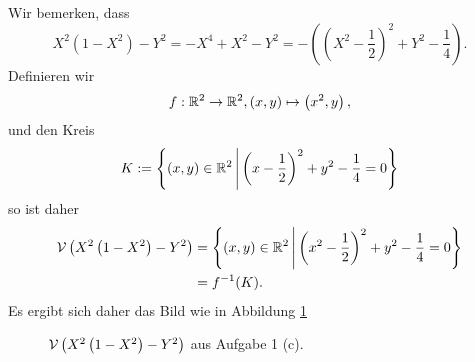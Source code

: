 \documentclass[a4paper,10pt]{article}
\begin{document}
\subsection{}
Wir bemerken, dass
\[
 X^2 \left( 1 - X^2 \right) - Y^2
 = -X^4 + X^2 - Y^2
 = -\left( \left(X^2 - \frac{1}{2} \right)^2 + Y^2 - \frac{1}{4} \right).
\]
Definieren wir
\[
 f : \mathbb{R}^2 \to \mathbb{R}^2, (x,y) \mapsto \left(x^2,y\right),
\]
und den Kreis
\[
 K := \left\{ (x,y) \in \mathbb{R}^2 \,\middle|\, \left(x - \frac{1}{2} \right)^2 + y^2 - \frac{1}{4} = 0 \right\}
\]
so ist daher
\begin{align*}
 \mathcal{V}\left( X^2 \left( 1 - X^2 \right) - Y^2 \right)
 &= \left\{ (x,y) \in \mathbb{R}^2 \,\middle|\, \left(x^2 - \frac{1}{2} \right)^2 + y^2 - \frac{1}{4} = 0 \right\} \\
 &= f^{-1}(K).
\end{align*}
Es ergibt sich daher das Bild wie in Abbildung \ref{fig: lemis carte}
\begin{figure}\centering
 \caption{$\mathcal{V}\left(X^2 \left( 1 - X^2 \right) - Y^2\right)$ aus Aufgabe 1 (c).}
 \label{fig: lemis carte}
\end{figure}
\end{document}
